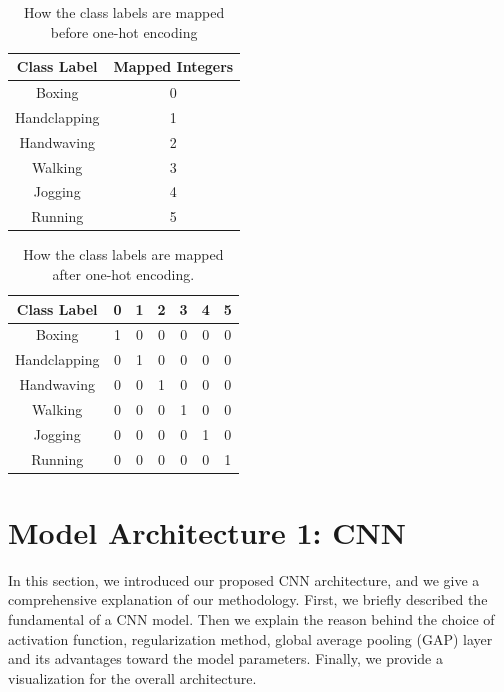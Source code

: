 \begin{table}[ht]
\caption{How the class labels are mapped before one-hot encoding}
\centering
\begin{tabular}{|c|c|}
\hline
\textbf{Class Label} & \textbf{Mapped Integers} \\ \hline
Boxing               & 0                        \\ \hline
Handclapping         & 1                        \\ \hline
Handwaving           & 2                        \\ \hline
Walking              & 3                        \\ \hline
Jogging              & 4                        \\ \hline
Running              & 5                        \\ \hline
\end{tabular}

\label{tb:onehotencoding}
\end{table}
\begin{table}[ht]
\caption{How the class labels are mapped after one-hot encoding.}

\centering
\begin{tabular}{|c|c|c|c|c|c|c|}
\hline
\textbf{Class Label} & \textbf{0} & \textbf{1} & \textbf{2} & \textbf{3} & \textbf{4} & \textbf{5} \\ \hline
Boxing               & 1          & 0          & 0          & 0          & 0          & 0          \\ \hline
Handclapping         & 0          & 1          & 0          & 0          & 0          & 0          \\ \hline
Handwaving           & 0          & 0          & 1          & 0          & 0          & 0          \\ \hline
Walking              & 0          & 0          & 0          & 1          & 0          & 0          \\ \hline
Jogging              & 0          & 0          & 0          & 0          & 1          & 0          \\ \hline
Running              & 0          & 0          & 0          & 0          & 0          & 1          \\ \hline
\end{tabular}
\label{tb:onehotencoding2}
\end{table}


\section{Model Architecture 1: CNN}
In this section, we introduced our proposed CNN architecture, and we give a comprehensive explanation of our methodology. First, we briefly described the fundamental of a CNN model. Then we explain the reason behind the choice of activation function, regularization method, global average pooling (GAP) layer and its advantages toward the model parameters. Finally, we provide a visualization for the overall architecture.  

